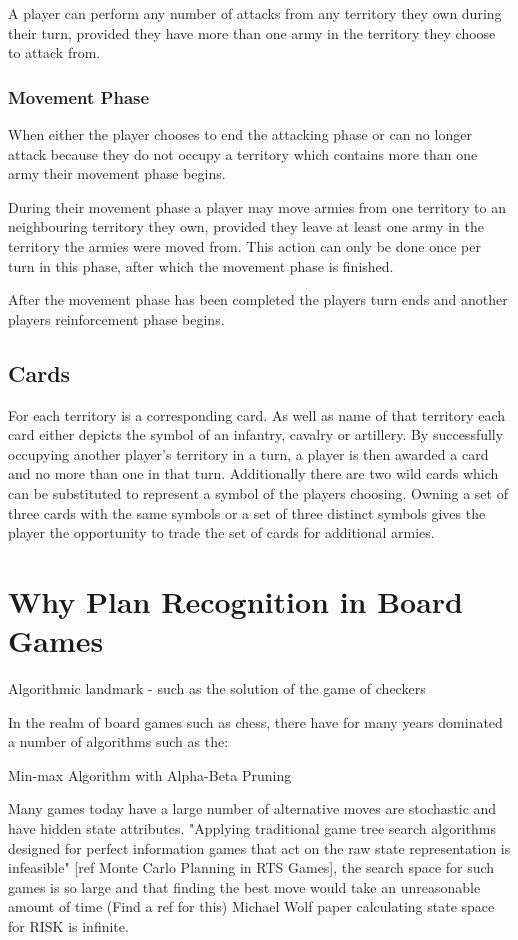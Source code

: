 \documentclass[parskip]{cs4rep}
\begin{document}
A player can perform any number of attacks from any territory they own during their turn, provided they have more than one army in the territory they choose to attack from.

\subsubsection{Movement Phase}

When either the player chooses to end the attacking phase or can no longer attack because they do not occupy a territory which contains more than one army their movement phase begins.

During their movement phase a player may move armies from one territory to an neighbouring territory they own, provided they leave at least one army in the territory the armies were moved from. This action can only be done once per turn in this phase, after which the movement phase is finished.

After the movement phase has been completed the players turn ends and another players reinforcement phase begins.
\newpage

\subsection{Cards}

For each territory is a corresponding card. As well as name of that territory each card either depicts the symbol of an infantry, cavalry or artillery. By successfully occupying another player's territory in a turn, a player is then awarded a card and no more than one in that turn. Additionally there are two wild cards which can be substituted to represent a symbol of the players choosing. Owning a set of three cards with the same symbols or a set of three distinct symbols gives the player the opportunity to trade the set of cards for additional armies.

\section{Why Plan Recognition in Board Games}

Algorithmic landmark - such as the solution of the game of checkers 

In the realm of board games such as chess, there have for many years dominated a number of algorithms such as the:

Min-max Algorithm with Alpha-Beta Pruning

Many games today have a large number of alternative moves are stochastic and have hidden state attributes. "Applying traditional game tree search algorithms designed for perfect information games that act on the raw state representation is infeasible" [ref Monte Carlo Planning in RTS Games], the search space for such games is so large and that finding the best move would take an unreasonable amount of time (Find a ref for this) Michael Wolf paper calculating state space for RISK is infinite.
\end{document}
